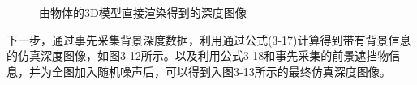 \begin{figure}[htb]
{\begin{minipage}[b]{0.5\textwidth}
		\end{minipage}}
	\caption{由物体的3D模型直接渲染得到的深度图像} 
\end{figure}

下一步，通过事先采集背景深度数据，利用通过公式(3-17)计算得到带有背景信息的仿真深度图像，如图3-12所示。以及利用公式3-18和事先采集的前景遮挡物信息，并为全图加入随机噪声后，可以得到入图3-13所示的最终仿真深度图像。

